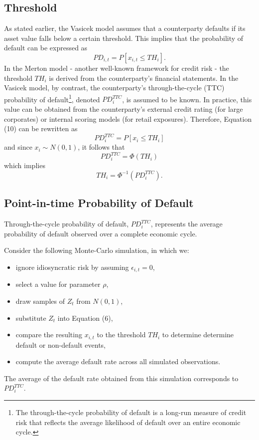 \documentclass[11pt,a4paper]{article}
\begin{document}
\subsection{Threshold}

As stated earlier, the Vasicek model assumes that a counterparty defaults if its asset value falls below a certain threshold. This implies that the probability of default can be expressed as
\begin{equation}
PD_{i, t} = P[x_{i, t} \le TH_i].
\end{equation}
In the Merton model - another well-known framework for credit risk - the threshold $TH_i$ is derived from the counterparty’s financial statements. In the Vasicek model, by contrast, the counterparty’s through-the-cycle (TTC) probability of default\footnote{The through-the-cycle probability of default is a long-run measure of credit risk that reflects the average likelihood of default over an entire economic cycle.}, denoted $PD_i^{TTC}$, is assumed to be known. In practice, this value can be obtained from the counterparty’s external credit rating (for large corporates) or internal scoring models (for retail exposures). Therefore, Equation (10) can be rewritten as
\begin{equation}
PD_i^{TTC} = P[x_i \le TH_i]
\end{equation}
and since $x_i \sim N(0, 1)$, it follows that
\begin{equation}
PD_i^{TTC} = \Phi(TH_i)
\end{equation}
which implies
\begin{equation}
TH_i = \Phi^{-1}(PD_i^{TTC}).
\end{equation}

\subsection{Point-in-time Probability of Default}

Through-the-cycle probability of default, $PD_i^{TTC}$, represents the average probability of default observed over a complete economic cycle.

Consider the following Monte-Carlo simulation, in which we:
\begin{itemize}
\item ignore idiosyncratic risk by assuming $\epsilon_{i, t} = 0$,
\item select a value for parameter $\rho$,
\item draw samples of $Z_t$ from $N(0, 1)$,
\item substitute $Z_t$ into Equation (6),
\item compare the resulting $x_{i, t}$ to the threshold $TH_i$ to determine determine default or non-default events,
\item compute the average default rate across all simulated observations.
\end{itemize}
The average of the default rate obtained from this simulation corresponds to $PD_i^{TTC}$.
\end{document}
